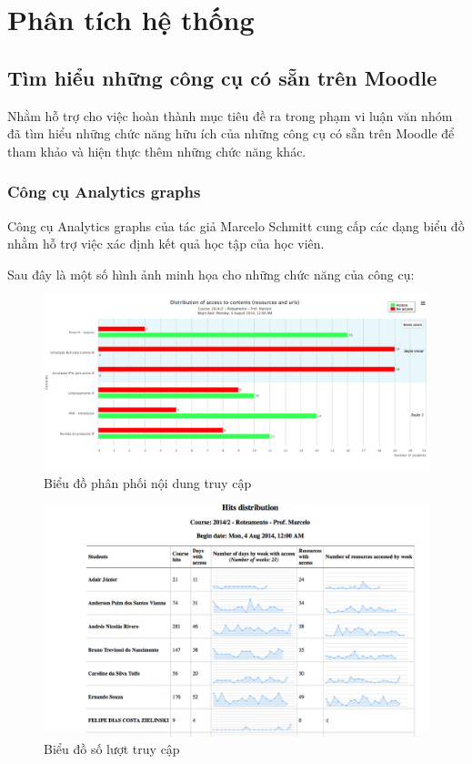 \setcounter{chapter}{2}
\fontsize{13}{5}\selectfont
\chapter{Phân tích hệ thống}

\section{Tìm hiểu những công cụ có sẵn trên Moodle}

Nhằm hỗ trợ cho việc hoàn thành mục tiêu đề ra trong phạm vi luận văn nhóm đã tìm hiểu những chức năng hữu ích của những công cụ có sẵn trên Moodle để tham khảo và hiện thực thêm những chức năng khác.

\subsection{Công cụ Analytics graphs}

Công cụ Analytics graphs của tác giả Marcelo Schmitt cung cấp các dạng biểu đồ nhằm hỗ trợ việc xác định kết quả học tập của học viên. 

Sau đây là một số hình ảnh minh họa cho những chức năng của công cụ:

\begin{center}
	\begin{figure}[htp]
		\begin{center}
			\includegraphics[width=0.8\linewidth]{img/43}
		\end{center}
		\caption{Biểu đồ phân phối nội dung truy cập}
		\label{refhinh81}
	\end{figure}
\end{center}

\begin{center}
	\begin{figure}[htp]
		\begin{center}
			\includegraphics[width=0.8\linewidth]{img/44}
		\end{center}
		\caption{Biểu đồ số lượt truy cập}
		\label{refhinh82}
	\end{figure}
\end{center}

